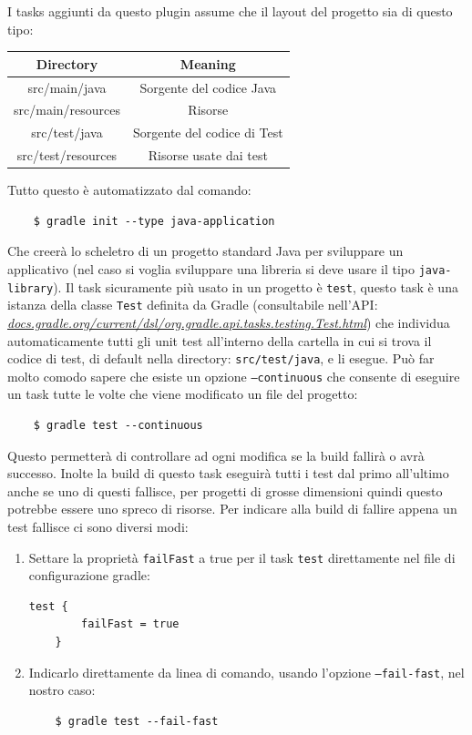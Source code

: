 I tasks aggiunti da questo plugin assume che il layout del progetto sia di questo tipo:
\begin{center}
\begin{tabular}{|c|c|}
\hline
Directory & Meaning  \\
\hline
\hline
    src/main/java & Sorgente del codice Java\\
    src/main/resources & Risorse \\
    src/test/java & Sorgente del codice di Test \\
    src/test/resources & Risorse usate dai test \\
\hline
\end{tabular}
\end{center}
Tutto questo è automatizzato dal comando:
\begin{verbatim}
    $ gradle init --type java-application\end{verbatim}
Che creerà lo scheletro di un progetto standard Java per sviluppare un applicativo (nel caso si voglia sviluppare una libreria si deve usare il tipo \texttt{java-library}). Il task sicuramente più usato in un progetto è \texttt{test}, questo task è una istanza della classe \texttt{Test} definita da Gradle (consultabile nell'API: \textit{\href{https://docs.gradle.org/current/dsl/org.gradle.api.tasks.testing.Test.html}{docs.gradle.org/current/dsl/org.gradle.api.tasks.testing.Test.html}}) che individua automaticamente tutti gli unit test all'interno della cartella in cui si trova il codice di test, di default nella directory: \texttt{src/test/java}, e li esegue. Può far molto comodo sapere che esiste un opzione \texttt{--continuous} che consente di eseguire un task tutte le volte che viene modificato un file del progetto:
\begin{verbatim}
    $ gradle test --continuous\end{verbatim}
Questo permetterà di controllare ad ogni modifica se la build fallirà o avrà successo. Inolte la build di questo task eseguirà tutti i test dal primo all'ultimo anche se uno di questi fallisce, per progetti di grosse dimensioni quindi questo potrebbe essere uno spreco di risorse. \label{failfast} Per indicare alla build di fallire appena un test fallisce ci sono diversi modi:
\begin{enumerate}
    \item Settare la proprietà \texttt{failFast} a true per il task \texttt{test} direttamente nel file di configurazione gradle:
    \begin{lstlisting}[frame=single]
    test {
        failFast = true
    }
    \end{lstlisting}
    \item Indicarlo direttamente da linea di comando, usando l'opzione \texttt{--fail-fast}, nel nostro caso:
\begin{verbatim}
    $ gradle test --fail-fast \end{verbatim}
\end{enumerate}
